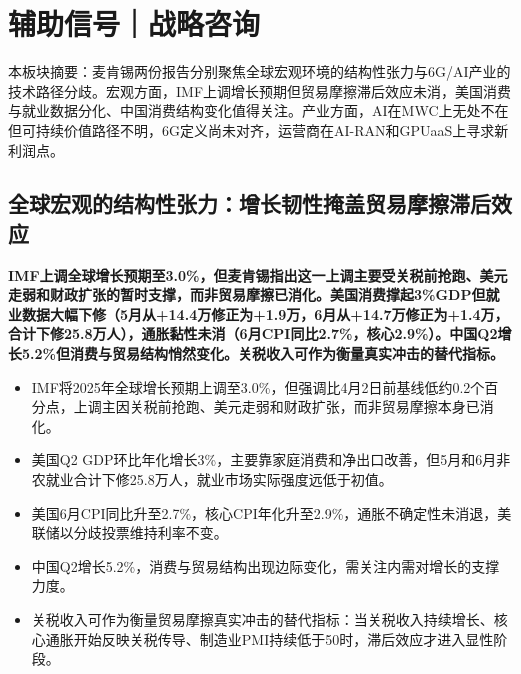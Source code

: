 \documentclass[11pt]{ctexart}
\begin{document}
\section{辅助信号｜战略咨询}
本板块摘要：麦肯锡两份报告分别聚焦全球宏观环境的结构性张力与6G/AI产业的技术路径分歧。宏观方面，IMF上调增长预期但贸易摩擦滞后效应未消，美国消费与就业数据分化、中国消费结构变化值得关注。产业方面，AI在MWC上无处不在但可持续价值路径不明，6G定义尚未对齐，运营商在AI-RAN和GPUaaS上寻求新利润点。
\subsection{全球宏观的结构性张力：增长韧性掩盖贸易摩擦滞后效应}
\textbf{IMF上调全球增长预期至3.0\%，但麦肯锡指出这一上调主要受关税前抢跑、美元走弱和财政扩张的暂时支撑，而非贸易摩擦已消化。美国消费撑起3\%GDP但就业数据大幅下修（5月从+14.4万修正为+1.9万，6月从+14.7万修正为+1.4万，合计下修25.8万人），通胀黏性未消（6月CPI同比2.7\%，核心2.9\%）。中国Q2增长5.2\%但消费与贸易结构悄然变化。关税收入可作为衡量真实冲击的替代指标。}
\begin{itemize}
  \item IMF将2025年全球增长预期上调至3.0\%，但强调比4月2日前基线低约0.2个百分点，上调主因关税前抢跑、美元走弱和财政扩张，而非贸易摩擦本身已消化。
  \item 美国Q2 GDP环比年化增长3\%，主要靠家庭消费和净出口改善，但5月和6月非农就业合计下修25.8万人，就业市场实际强度远低于初值。
  \item 美国6月CPI同比升至2.7\%，核心CPI年化升至2.9\%，通胀不确定性未消退，美联储以分歧投票维持利率不变。
  \item 中国Q2增长5.2\%，消费与贸易结构出现边际变化，需关注内需对增长的支撑力度。
  \item 关税收入可作为衡量贸易摩擦真实冲击的替代指标：当关税收入持续增长、核心通胀开始反映关税传导、制造业PMI持续低于50时，滞后效应才进入显性阶段。
\end{itemize}
\end{document}
